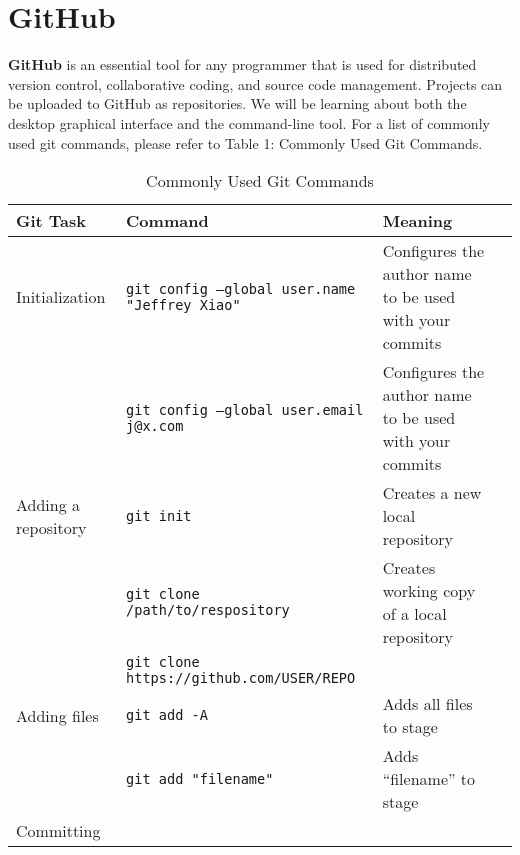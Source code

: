 \documentclass[11pt, letterpaper]{article}
\begin{document}
	\section{GitHub}
		\textbf{GitHub} is an essential tool for any programmer that is used for distributed version control, collaborative coding, and source code management. Projects can be uploaded to GitHub as repositories. We will be learning about both the desktop graphical interface and the command-line tool. For a list of commonly used git commands, please refer to Table 1: Commonly Used Git Commands.

		\begin{table}[!htb]
			\vspace*{-4cm}
			\begin{center}
				\caption{Commonly Used Git Commands}
				\hspace*{-2.5cm}
				\vspace*{-5cm}
				\begin{tabular}{p{2cm}|l|p{4cm} l}
					\toprule
					Git Task & Command & Meaning \\
					\midrule
					Initialization 
					
					& \texttt{git config --global user.name "Jeffrey Xiao"} & Configures the author name to be used with your commits \\\cmidrule{2-3}
									
					& \texttt{git config --global user.email j@x.com} & Configures the author name to be used with your commits \\
					
					\midrule
					Adding a repository
					
					& \texttt{git init} & Creates a new local repository \\\cmidrule{2-3}

					& \texttt{git clone /path/to/respository} & Creates working copy of a local repository \\\cmidrule{2-3}
										
					& \texttt{git clone https://github.com/USER/REPO} \\

					\midrule
					Adding files

					& \texttt{git add -A} & Adds all files to stage \\\cmidrule{2-3}
					
					& \texttt{git add "filename"} & Adds ``filename'' to stage \\

					\midrule
					Committing


\end{tabular}
\end{center}
\end{table}
\end{document}
